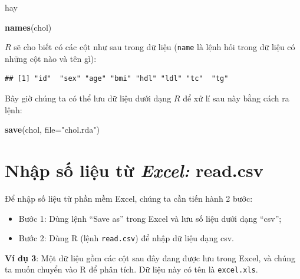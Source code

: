 \documentclass[
]{book}
\newenvironment{Shaded}{\begin{snugshade}}{\end{snugshade}}
\newcommand{\DataTypeTok}[1]{\textcolor[rgb]{0.13,0.29,0.53}{#1}}
\newcommand{\KeywordTok}[1]{\textcolor[rgb]{0.13,0.29,0.53}{\textbf{#1}}}
\newcommand{\NormalTok}[1]{#1}
\newcommand{\StringTok}[1]{\textcolor[rgb]{0.31,0.60,0.02}{#1}}
\providecommand{\tightlist}{%
  \setlength{\itemsep}{0pt}\setlength{\parskip}{0pt}}
\begin{document}
hay

\begin{Shaded}
\begin{Highlighting}[]
\KeywordTok{names}\NormalTok{(chol)}
\end{Highlighting}
\end{Shaded}

\(R\) sẽ cho biết có các cột như sau trong dữ liệu (\texttt{name} là lệnh hỏi trong dữ liệu có những cột nào và tên gì):

\begin{verbatim}
## [1] "id"  "sex" "age" "bmi" "hdl" "ldl" "tc"  "tg"
\end{verbatim}

Bây giờ chúng ta có thể lưu dữ liệu dưới dạng \(R\) để xử lí sau này bằng cách ra lệnh:

\begin{Shaded}
\begin{Highlighting}[]
\KeywordTok{save}\NormalTok{(chol, }\DataTypeTok{file=}\StringTok{"chol.rda"}\NormalTok{)}
\end{Highlighting}
\end{Shaded}

\hypertarget{nhux1eadp-sux1ed1-liux1ec7u-tux1eeb-excel-read.csv}{%
\section{\texorpdfstring{Nhập số liệu từ \emph{Excel:} read.csv}{Nhập số liệu từ Excel: read.csv}}\label{nhux1eadp-sux1ed1-liux1ec7u-tux1eeb-excel-read.csv}}

Để nhập số liệu từ phần mềm Excel, chúng ta cần tiến hành 2 bước:

\begin{itemize}
\tightlist
\item
  Bước 1: Dùng lệnh ``Save as'' trong Excel và lưu số liệu dưới dạng ``csv'';
\item
  Bước 2: Dùng R (lệnh \texttt{read.csv}) để nhập dữ liệu dạng csv.
\end{itemize}

\textbf{Ví dụ 3}: Một dữ liệu gồm các cột sau đây đang được lưu trong Excel, và chúng ta muốn chuyển vào R để phân tích. Dữ liệu này có tên là \texttt{excel.xls}.
\end{document}
